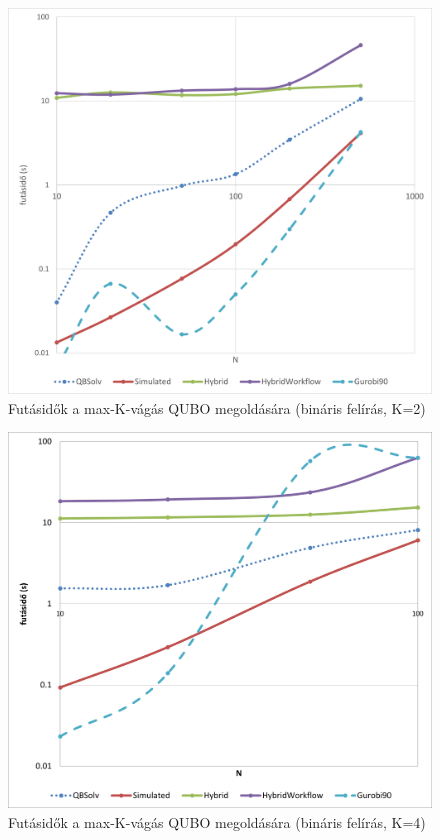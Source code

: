 \begin{figure}[!ht]
	\centering
	\includegraphics[width=150mm, keepaspectratio]{figures/diagrams/maxKCutQUBO_K2_bin.png}
	\caption{Futásidők a max-K-vágás QUBO megoldására (bináris felírás, K=2)}
	\label{fig:maxKCutQUBO_K2_bin}
\end{figure}

\begin{figure}[!ht]
	\centering
	\includegraphics[width=150mm, keepaspectratio]{figures/diagrams/maxKCutQUBO_K4_bin.png}
	\caption{Futásidők a max-K-vágás QUBO megoldására (bináris felírás, K=4)}
	\label{fig:maxKCutQUBO_K4_bin}
\end{figure}